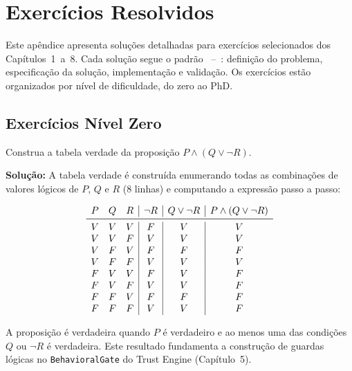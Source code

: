 \chapter{Exercícios Resolvidos}
\label{apend:exercicios}

Este apêndice apresenta soluções detalhadas para exercícios selecionados dos
Capítulos~1~a~8. Cada solução segue o padrão \sdd{}~--~\tdd: definição do
problema, especificação da solução, implementação e validação. Os exercícios
estão organizados por nível de dificuldade, do zero ao PhD.

\section{Exercícios Nível Zero}
\label{sec:exer-nivel-zero}
\nivelzero

\begin{exercicio}\label{exer:resol-logic}
Construa a tabela verdade da proposição \(P \land (Q \lor \neg R)\).
\end{exercicio}

\textbf{Solução:} A tabela verdade é construída enumerando todas as combinações
de valores lógicos de \(P\), \(Q\) e \(R\) (8 linhas) e computando a expressão
passo a passo:

\[
\begin{array}{ccc|c|c|c}
P & Q & R & \neg R & Q\lor\neg R & P\land(Q\lor\neg R) \\
\midrule
V & V & V & F & V & V \\
V & V & F & V & V & V \\
V & F & V & F & F & F \\
V & F & F & V & V & V \\
F & V & V & F & V & F \\
F & V & F & V & V & F \\
F & F & V & F & F & F \\
F & F & F & V & V & F \\
\end{array}
\]

A proposição é verdadeira quando \(P\) é verdadeiro e ao menos uma das
condições \(Q\) ou \(\neg R\) é verdadeira. Este resultado fundamenta a
construção de guardas lógicas no \texttt{BehavioralGate} do Trust Engine
(Capítulo~5).

